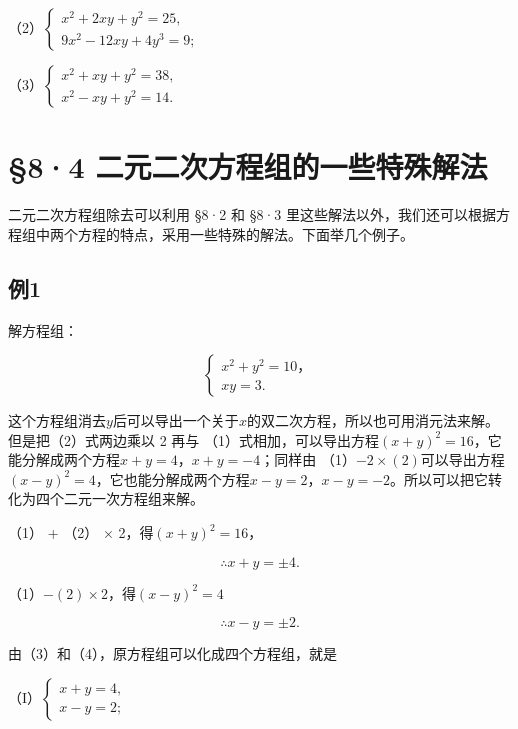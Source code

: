 （2）\(\left\{ \begin{array}{l} x^{2} + 2xy + y^{2} = 25, \\ 9x^{2} - 12xy + 4y^{3} = 9; \end{array} \right.\)

（3）\(\left\{ \begin{array}{l} x^{2} + xy + y^{2} = 38, \\ x^{2} - xy + y^{2} = 14. \end{array} \right.\)

\section{§8·4 二元二次方程组的一些特殊解法}

二元二次方程组除去可以利用 §8·2 和 §8·3
里这些解法以外，我们还可以根据方程组中两个方程的特点，采用一些特殊的解法。下面举几个例子。

\subsection{例1}

解方程组：

\[
\left\{ \begin{array}{l} x ^ {2} + y ^ {2} = 10\text{，} \\ x y = 3. \end{array} \right. \tag{1}
\]

这个方程组消去\(y\)后可以导出一个关于\(x\)的双二次方程，所以也可用消元法来解。但是把（2）式两边乘以
2 再与
（1）式相加，可以导出方程\((x + y)^2 = 16\)，它能分解成两个方程\(x + y = 4\)，\(x + y = -4\)；同样由
（1）\(-2 \times (2)\)可以导出方程\((x - y)^2 = 4\)，它也能分解成两个方程\(x - y = 2\)，\(x - y = -2\)。所以可以把它转化为四个二元一次方程组来解。


（1） + （2） × 2，得\((x + y)^{2} = 16\)，

\[
\therefore x + y = \pm 4. \tag{3}
\]

（1）\(-(2) \times 2\)，得\((x - y)^{2} = 4\)

\[
\therefore x - y = \pm 2. \tag{4}
\]

由（3）和（4），原方程组可以化成四个方程组，就是

（I）\(\left\{ \begin{array}{l} x + y = 4, \\ x - y = 2; \end{array} \right.\)

